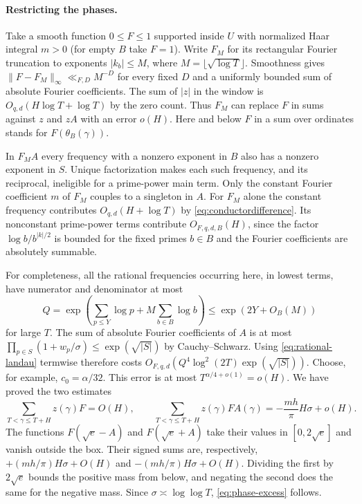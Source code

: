 \paragraph{Restricting the phases.}
Take a smooth function $0\le F\le1$ supported inside $U$ with normalized
Haar integral $m>0$ (for empty $B$ take $F=1$). Write $F_M$ for its
rectangular Fourier truncation to exponents $|k_b|\le M$, where
$M=\lfloor\sqrt{\log T}\rfloor$. Smoothness gives
$\|F-F_M\|_\infty\ll_{F,D}M^{-D}$ for every fixed $D$ and a uniformly
bounded sum of absolute Fourier coefficients. The sum of $|z|$ in the
window is $O_{q,d}(H\log T+\log T)$ by the zero count. Thus $F_M$ can
replace $F$ in sums against $z$ and $zA$ with an error $o(H)$.
Here and below $F$ in a sum over ordinates stands for $F(\theta_B(\gamma))$.

In $F_M A$ every frequency with a nonzero exponent in $B$ also has
a nonzero exponent in $S$. Unique factorization makes each such
frequency, and its reciprocal, ineligible for a prime-power main term.
Only the constant Fourier coefficient $m$ of $F_M$ couples to a
singleton in $A$. For $F_M$ alone the constant frequency contributes
$O_{q,d}(H+\log T)$ by \eqref{eq:conductordifference}. Its nonconstant
prime-power terms contribute $O_{F,q,d,B}(H)$, since the factor
$\log b/b^{|k|/2}$ is bounded for the fixed primes $b\in B$ and the
Fourier coefficients are absolutely summable.

For completeness, all the rational frequencies occurring here, in
lowest terms, have numerator and denominator at most
\[
 Q=\exp\!\left(\sum_{p\le Y}\log p+M\sum_{b\in B}\log b\right)
       \le \exp(2Y+O_B(M))
\]
for large $T$. The sum of absolute Fourier coefficients of $A$ is at
most $\prod_{p\in S}(1+w_p/\sigma)\le\exp(\sqrt{|S|})$ by Cauchy--Schwarz.
Using \eqref{eq:rational-landau} termwise therefore costs
$O_{F,q,d}(Q^4\log^2(2T)\exp(\sqrt{|S|}))$. Choose, for example,
$c_0=\alpha/32$. This error is at most $T^{\alpha/4+o(1)}=o(H)$.
We have proved the two estimates
\[
 \sum_{T<\gamma\le T+H}z(\gamma)F=O(H),\qquad
 \sum_{T<\gamma\le T+H}z(\gamma)F A(\gamma)
        =-\frac{mh}{\pi}H\sigma+o(H).
\]
The functions $F(\sqrt e-A)$ and $F(\sqrt e+A)$ take their values
in $[0,2\sqrt e]$ and vanish outside the box. Their signed sums are,
respectively, $+(mh/\pi)H\sigma+O(H)$ and
$-(mh/\pi)H\sigma+O(H)$. Dividing the first by $2\sqrt e$ bounds the
positive mass from below, and negating the second does the same for the
negative mass. Since $\sigma\asymp\log\log T$,
\eqref{eq:phase-excess} follows.

